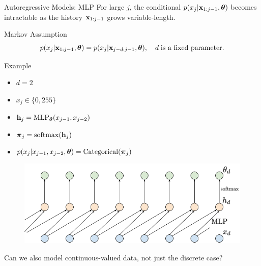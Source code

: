 \documentclass{beamer}
\begin{document}
\begin{frame}{Autoregressive Models: MLP}
	For large $j$, the conditional $p(x_j | \mathbf{x}_{1:j - 1}, \boldsymbol{\theta})$ becomes intractable as the history $\mathbf{x}_{1:j-1}$ grows variable-length.
    \eqpause
	\begin{block}{Markov Assumption}
		\vspace{-0.7cm}
		$$
			p(x_j | \mathbf{x}_{1:j - 1}, \boldsymbol{\theta}) = p(x_j | \mathbf{x}_{j - d:j - 1}, \boldsymbol{\theta}),\quad d\;\text{is a fixed parameter}.
		$$
	\end{block}
    \eqpause
	\vspace{-0.5cm}
	\begin{block}{Example}
		\begin{minipage}[t]{0.39\columnwidth}
			{\small
			\begin{itemize}
				\item $d = 2$
				\item $x_j \in \{0, 255\}$
				\item $\mathbf{h}_j = \mathrm{MLP}_{\boldsymbol{\theta}}(x_{j - 1}, x_{j - 2})$
				\item $\boldsymbol{\pi}_j = \mathrm{softmax}(\mathbf{h}_j)$
				\item $p(x_j | x_{j - 1}, x_{j - 2}, \boldsymbol{\theta}) = \mathrm{Categorical}(\boldsymbol{\pi}_j)$
			\end{itemize}
			}
		\end{minipage}%
		\begin{minipage}[t]{0.61\columnwidth}
			 \begin{figure}
			   \centering
			   \includegraphics[width=1.0\linewidth]{figs/sequential_MLP}
			 \end{figure}
			 \eqpause
			 Can we also model continuous-valued data, not just the discrete case?
		\end{minipage}
	\end{block}
\end{frame}
\end{document}
